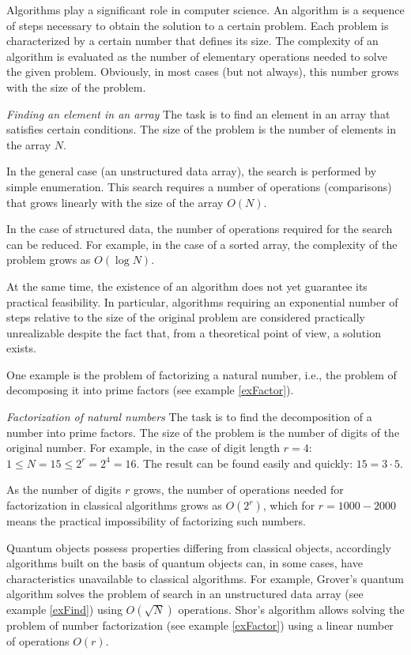 Algorithms play a significant role in computer science. An algorithm
is a sequence of steps necessary to obtain
the solution to a certain problem. Each problem is characterized by a certain
number that defines its size. The complexity of an algorithm is evaluated
as the number of 
elementary operations needed to solve the given
problem. Obviously, in most cases (but not always), this number
grows with the size of the problem. 

\begin{example}
\emph{Finding an element in an array}
\label{exFind}
The task is to find an element in an array that satisfies certain
conditions. The size of the problem is the number of elements in the array $N$. 

In the general case (an unstructured data array), the search is performed
by simple enumeration. This search requires a number of operations (comparisons) that
grows linearly with the size of the array $O\left( N \right)$.

In the case of structured data, the number of operations required for the search
can be reduced. For example, in the case of a sorted array,
the complexity of the problem grows as $O\left(\log N\right)$.
\end{example}

At the same time, the existence of an algorithm does not yet
guarantee its practical feasibility. In particular, algorithms
requiring an exponential number of steps relative to the size of the original problem
are considered practically unrealizable despite the fact that,
from a theoretical point of view, a solution exists.

One example is the problem of factorizing a natural number,
i.e., the problem of decomposing it into prime factors (see example
\ref{exFactor}).  

\begin{example}
\emph{Factorization of natural numbers}
\label{exFactor}
The task is to find the decomposition of a number into prime factors.
The size of the problem
is the number of digits of the original number. For example, in the case of digit length
$r = 4$: $1 \le N = 15 \le 2^r = 2^4 = 16$. The result can be
found easily and quickly: $15 = 3 \cdot 5$. 

As the number of digits $r$ grows, the number of operations needed for
factorization in classical algorithms grows as
$O\left(2^r\right)$, which for $r = 1000 - 2000$ means the practical
impossibility of factorizing such numbers. 
\end{example}

Quantum objects possess properties differing from classical
objects, accordingly algorithms built on the basis of quantum
objects can, in some cases, have characteristics unavailable
to classical algorithms. For example, Grover's quantum algorithm
\cite{Grover96afast} solves the problem of search in an unstructured
data array (see example \ref{exFind}) using
$O\left(\sqrt{N}\right)$ operations. Shor's algorithm \cite{bShor94}
allows solving the problem of number factorization (see example
\ref{exFactor}) using a linear number of operations $O\left(r\right)$. 
